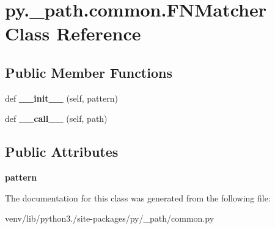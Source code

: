 \hypertarget{classpy_1_1__path_1_1common_1_1_f_n_matcher}{}\section{py.\+\_\+path.\+common.\+F\+N\+Matcher Class Reference}
\label{classpy_1_1__path_1_1common_1_1_f_n_matcher}
\subsection*{Public Member Functions}
\begin{DoxyCompactItemize}
\item 
\mbox{\label{classpy_1_1__path_1_1common_1_1_f_n_matcher_ad77388656fce716e90b27a7054d92c35}} 
def {\bfseries \+\_\+\+\_\+init\+\_\+\+\_\+} (self, pattern)
\item 
\mbox{\label{classpy_1_1__path_1_1common_1_1_f_n_matcher_ab83731dd0da37d7f7f296930bb8c4b37}} 
def {\bfseries \+\_\+\+\_\+call\+\_\+\+\_\+} (self, path)
\end{DoxyCompactItemize}
\subsection*{Public Attributes}
\begin{DoxyCompactItemize}
\item 
\mbox{\label{classpy_1_1__path_1_1common_1_1_f_n_matcher_a2443acc73349252339ed6b322e258fcd}} 
{\bfseries pattern}
\end{DoxyCompactItemize}


The documentation for this class was generated from the following file\+:\begin{DoxyCompactItemize}
\item 
venv/lib/python3./site-\/packages/py/\+\_\+path/common.\+py\end{DoxyCompactItemize}
